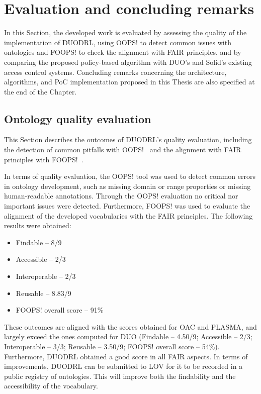 
\section{Evaluation and concluding remarks}
\label{sec:evaluation_conclusions}

In this Section, the developed work is evaluated by assessing the quality of the implementation of DUODRL, using OOPS! to detect common issues with ontologies and FOOPS! to check the alignment with FAIR principles, and by comparing the proposed policy-based algorithm with DUO's and Solid's existing access control systems.
Concluding remarks concerning the architecture, algorithms, and PoC implementation proposed in this Thesis are also specified at the end of the Chapter.

\subsection{Ontology quality evaluation}
\label{sec:ontology_evaluation}

This Section describes the outcomes of DUODRL's quality evaluation, including the detection of common pitfalls with OOPS!~\citep{poveda-villalon_oops_2014} and the alignment with FAIR principles with FOOPS!~\citep{garijo_foops_2021}. 

In terms of quality evaluation, the OOPS! tool was used to detect common errors in ontology development, such as missing domain or range properties or missing human-readable annotations.
Through the OOPS! evaluation no critical nor important issues were detected.
Furthermore, FOOPS! was used to evaluate the alignment of the developed vocabularies with the FAIR principles.
The following results were obtained:
\begin{itemize}
    \item Findable -- 8/9
    \item Accessible -- 2/3
    \item Interoperable -- 2/3
    \item Reusable -- 8.83/9
    \item FOOPS! overall score -- 91\%
\end{itemize}
These outcomes are aligned with the scores obtained for OAC and PLASMA, and largely exceed the ones computed for DUO (Findable -- 4.50/9; Accessible -- 2/3; Interoperable -- 3/3; Reusable -- 3.50/9; FOOPS! overall score -- 54\%).
Furthermore, DUODRL obtained a good score in all FAIR aspects.
In terms of improvements, DUODRL can be submitted to LOV for it to be recorded in a public registry of ontologies.
This will improve both the findability and the accessibility of the vocabulary.

